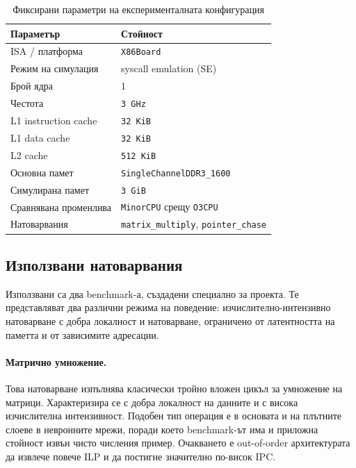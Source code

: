 \documentclass[12pt,a4paper]{article}
\begin{document}
\begin{table}[H]
    \centering
    \small
    \setlength{\tabcolsep}{6pt}
    \begin{tabular}{l l}
        \toprule
        Параметър & Стойност \\
        \midrule
        ISA / платформа & \texttt{X86Board} \\
        Режим на симулация & syscall emulation (SE) \\
        Брой ядра & 1 \\
        Честота & \texttt{3 GHz} \\
        L1 instruction cache & \texttt{32 KiB} \\
        L1 data cache & \texttt{32 KiB} \\
        L2 cache & \texttt{512 KiB} \\
        Основна памет & \texttt{SingleChannelDDR3\_1600} \\
        Симулирана памет & \texttt{3 GiB} \\
        Сравнявана променлива & \texttt{MinorCPU} срещу \texttt{O3CPU} \\
        Натоварвания & \texttt{matrix\_multiply}, \texttt{pointer\_chase} \\
        \bottomrule
    \end{tabular}
    \caption{Фиксирани параметри на експерименталната конфигурация}
\end{table}

\subsection{Използвани натоварвания}
Използвани са два benchmark-а, създадени специално за проекта. Те представляват два различни режима на поведение: изчислително-интензивно натоварване с добра локалност и натоварване, ограничено от латентността на паметта и от зависимите адресации.

\paragraph{Матрично умножение.}
Това натоварване изпълнява класически тройно вложен цикъл за умножение на матрици. Характеризира се с добра локалност на данните и с висока изчислителна интензивност. Подобен тип операция е в основата и на плътните слоеве в невронните мрежи, поради което benchmark-ът има и приложна стойност извън чисто числения пример. Очакването е out-of-order архитектурата да извлече повече ILP и да постигне значително по-висок IPC.
\end{document}

